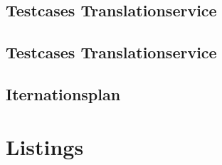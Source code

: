 \documentclass[10pt, oneside]{article}
\begin{document}
  \subsection{Testcases Translationservice}\label{sec:test:ts}
  \subsection{Testcases Translationservice}\label{sec:test:tu}
  \subsection{Iternationsplan}\label{sec:iterationplan}
  \section{Listings}
\end{document}
